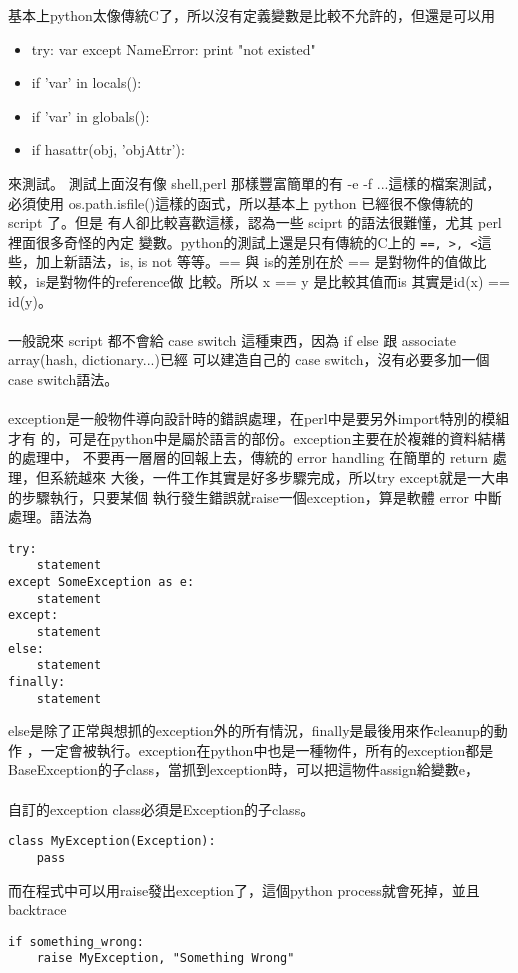 基本上python太像傳統C了，所以沒有定義變數是比較不允許的，但還是可以用
\begin{itemize}
  \item try: var
        except NameError: print "not existed"
  \item if 'var' in locals():
  \item if 'var' in globals():
  \item if hasattr(obj, 'objAttr'):
\end{itemize}
來測試。
測試上面沒有像 shell,perl 那樣豐富簡單的有 -e -f ...這樣的檔案測試，必須使用
os.path.isfile()這樣的函式，所以基本上 python 已經很不像傳統的 script 了。但是
有人卻比較喜歡這樣，認為一些 sciprt 的語法很難懂，尤其 perl 裡面很多奇怪的內定
變數。python的測試上還是只有傳統的C上的 \verb|==, >, <|這些，加上新語法，is,
is not 等等。== 與 is的差別在於 == 是對物件的值做比較，is是對物件的reference做
比較。所以 x == y 是比較其值而is 其實是id(x) == id(y)。
\\\\
一般說來 script 都不會給 case switch 這種東西，因為 if else 跟
associate array(hash, dictionary...)已經
可以建造自己的 case switch，沒有必要多加一個case switch語法。
\\\\
exception是一般物件導向設計時的錯誤處理，在perl中是要另外import特別的模組才有
的，可是在python中是屬於語言的部份。exception主要在於複雜的資料結構的處理中，
不要再一層層的回報上去，傳統的 error handling 在簡單的 return 處理，但系統越來
大後，一件工作其實是好多步驟完成，所以try except就是一大串的步驟執行，只要某個
執行發生錯誤就raise一個exception，算是軟體 error 中斷處理。語法為
\begin{verbatim}
try:
    statement
except SomeException as e:
    statement
except:
    statement
else:
    statement
finally:
    statement
\end{verbatim}
else是除了正常與想抓的exception外的所有情況，finally是最後用來作cleanup的動作
，一定會被執行。exception在python中也是一種物件，所有的exception都是
BaseException的子class，當抓到exception時，可以把這物件assign給變數e，
\\\\
自訂的exception class必須是Exception的子class。
\begin{verbatim}
class MyException(Exception):
    pass
\end{verbatim}
而在程式中可以用raise發出exception了，這個python process就會死掉，並且backtrace
\begin{verbatim}
if something_wrong:
    raise MyException, "Something Wrong"
\end{verbatim}


